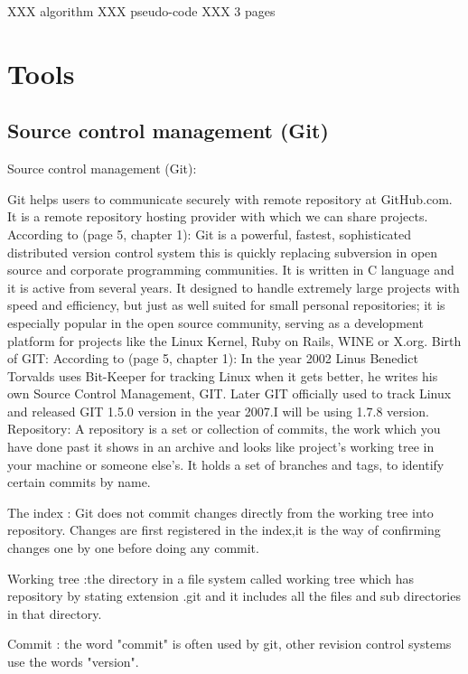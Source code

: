 \documentclass{report}
\begin{document}
XXX algorithm XXX pseudo-code XXX 3 pages



\section{Tools}
\label{sec:Tools}

\subsection{Source control management (Git)}
\label{sec:scm}

Source control management (Git):

Git helps users to communicate securely with remote repository at GitHub.com. It is a remote repository hosting provider with which we can share projects.	
According to \cite{Chacon2011ProGit} (page 5, chapter 1): Git is a powerful, fastest, sophisticated distributed version control system this is quickly replacing subversion in open source and corporate programming communities. It is written in C language and it is active from several years. It designed to handle extremely large projects with speed and efficiency,	but just as well suited for small personal repositories; it is especially popular in the open source community, serving as a development platform for projects like the Linux Kernel, Ruby on Rails, WINE or X.org.
Birth of GIT:
According to \cite{Chacon2011ProGit}(page 5, chapter 1): In the year 2002 Linus Benedict Torvalds uses Bit-Keeper for tracking Linux when it gets better, he writes his own Source Control Management, GIT. Later GIT officially used to track Linux and released GIT 1.5.0 version in the year 2007.I will be using 1.7.8 version.
Repository:  A repository is a set or collection of commits, the work which you have done past it shows in an archive and looks like project's working tree in your machine or someone else's. It holds a set of branches and tags, to identify certain commits by name.

The index : Git does not commit changes directly from the working tree into repository. Changes are first registered in the index,it is the way of confirming changes one by one before doing any commit.																										

Working tree :the directory in a file system called working tree which has repository by stating extension .git and it includes all the files and sub directories in that  directory.

Commit : the word "commit" is often used by git, other revision control systems use the words "version".
\end{document}
